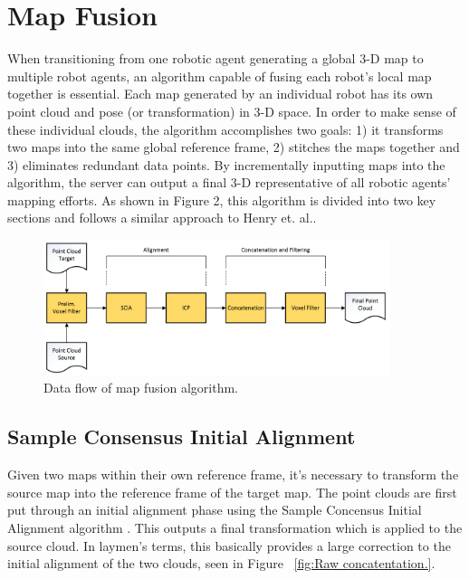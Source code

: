 \documentclass[letterpaper, oneside, 10pt]{report}
\begin{document}
\section{Map Fusion}
\noindent When transitioning from one robotic agent generating a global 3-D map to multiple robot agents, an algorithm capable of fusing each robot's local map together is essential. Each map generated by an individual robot has its own point cloud and pose (or transformation) in 3-D space. In order to make sense of these individual clouds, the algorithm accomplishes two goals: 1) it transforms two maps into the same global reference frame, 2) stitches the maps together and 3) eliminates redundant data points. By incrementally inputting maps into the algorithm, the server can output a final 3-D representative of all robotic agents' mapping efforts. As shown in Figure 2, this algorithm is divided into two key sections and follows a similar approach to Henry et. al.\cite{henry2012rgb}.

\begin{figure}[h]
 \caption{Data flow of map fusion algorithm.}
 \centering
   \includegraphics[width=0.9\textwidth]{images/mapfusion}
\end{figure}

    \subsection{Sample Consensus Initial Alignment}

    \noindent Given two maps within their own reference frame, it's necessary to transform the source map into the reference frame of the target map. The point clouds are first put through an initial alignment phase using the Sample Concensus Initial Alignment algorithm \cite{rusu2009fast}. This outputs a final transformation which is applied to the source cloud. In laymen's terms, this basically provides a large correction to the initial alignment of the two clouds, seen in Figure ~\ref{fig:Raw concatentation.}.
\end{document}
